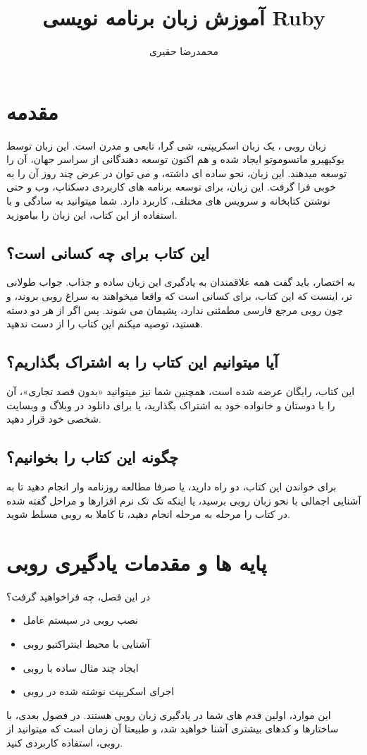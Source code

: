 \documentclass[11pt]{article}
\title{آموزش زبان برنامه نویسی Ruby}
\author{محمدرضا حقیری}
\begin{document}
\maketitle
\newpage{}
\tableofcontents
\newpage{}
\newpage{}
\section{مقدمه}
زبان روبی ، یک زبان اسکریپتی، شی گرا، تابعی و مدرن است. این زبان توسط یوکیهیرو ماتسوموتو
ایجاد شده و هم اکنون توسعه دهندگانی از سراسر جهان، آن را توسعه میدهند. این زبان، نحو
ساده ای داشته، و می توان در عرض چند روز آن را به خوبی فرا گرفت. این زبان، برای توسعه برنامه های کاربردی دسکتاپ، وب و حتی نوشتن کتابخانه و سرویس های مختلف، کاربرد دارد. شما میتوانید به سادگی و با استفاده از این کتاب، این زبان را بیاموزید. 
\subsection{این کتاب برای چه کسانی است؟}
به اختصار، باید گفت همه علاقمندان به یادگیری این زبان ساده و جذاب. جواب طولانی تر، اینست که این کتاب، برای کسانی است که واقعا میخواهند به سراغ روبی بروند، و چون روبی مرجع فارسی مطمئنی ندارد، پشیمان می شوند. پس اگر از هر دو دسته هستید، توصیه میکنم این کتاب را از دست ندهید. 

\subsection{آیا میتوانیم این کتاب را به اشتراک بگذاریم؟}
این کتاب، رایگان عرضه شده است، همچنین شما نیز میتوانید «بدون قصد تجاری»، آن را با دوستان و خانواده خود به اشتراک بگذارید، یا برای دانلود در وبلاگ و وبسایت شخصی خود قرار دهید. 
\subsection{چگونه این کتاب را بخوانیم؟}
برای خواندن این کتاب، دو راه دارید، یا صرفا مطالعه روزنامه وار انجام دهید تا به آشنایی اجمالی با نحو زبان روبی برسید، یا اینکه تک تک نرم افزارها و مراحل گفته شده در کتاب را مرحله به مرحله انجام دهید، تا کاملا به روبی مسلط شوید. 
\newpage{}
\section{پایه ها و مقدمات یادگیری روبی}
در این فصل، چه فراخواهید گرفت؟
\begin{itemize}
\item نصب روبی در سیستم عامل
\item آشنایی با محیط اینتراکتیو روبی
\item ایجاد چند مثال ساده با روبی
\item اجرای اسکریپت نوشته شده در روبی
\end{itemize}
این موارد، اولین قدم های شما در یادگیری زبان روبی هستند. در فصول بعدی، با ساختارها و کدهای بیشتری آشنا خواهید شد، و طبیعتا آن زمان است که میتوانید از روبی، استفاده کاربردی کنید. 
\end{document}
